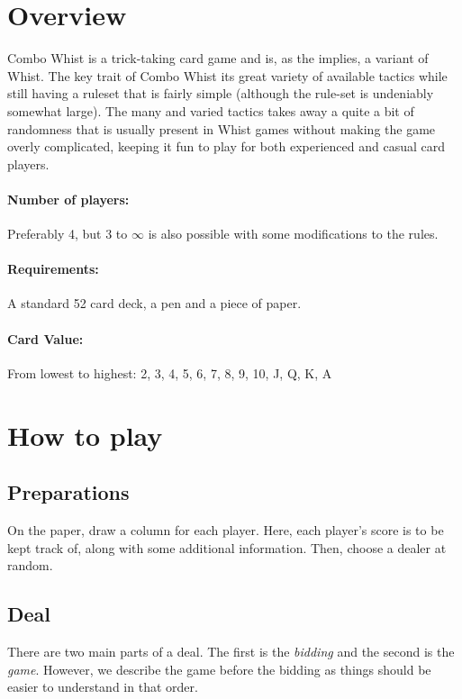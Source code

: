 \documentclass[a4paper]{article}
\begin{document}
	\section{Overview}
		
		Combo Whist is a trick-taking card game and is, as the implies, a variant of Whist. The key trait of Combo Whist its great variety of available tactics while still having a ruleset that is fairly simple (although the rule-set is undeniably somewhat large). The many and varied tactics takes away a quite a bit of randomness that is usually present in Whist games without making the game overly complicated, keeping it fun to play for both experienced and casual card players.
		
		\paragraph{Number of players:}
		Preferably 4, but 3 to $\infty$ is also possible with some modifications to the rules.
		
		\paragraph{Requirements:}
		A standard 52 card deck, a pen and a piece of paper.
		
		\paragraph{Card Value:}
		From lowest to highest: 2, 3, 4, 5, 6, 7, 8, 9, 10, J, Q, K, A
		
	\section{How to play}
		\subsection{Preparations}
		On the paper, draw a column for each player. Here, each player's score is to be kept track of, along with some additional information. Then, choose a dealer at random.

		\subsection{Deal}
		There are two main parts of a deal. The first is the \emph{bidding} and the second is the \emph{game}. However, we describe the game before the bidding as things should be easier to understand in that order.
		
\end{document}
